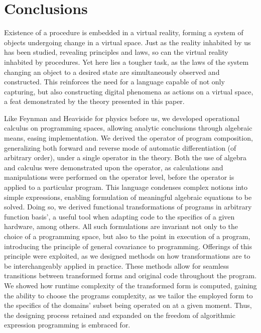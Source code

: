 \documentclass{article}
\begin{document}
\section{Conclusions}

Existence of a procedure is embedded in a virtual reality, forming a system of objects undergoing change in a virtual space. Just as the reality inhabited by us has been studied, revealing principles and laws, so can the virtual reality inhabited by procedures. Yet here lies a tougher task, as the laws of the system changing an object to a desired state are simultaneously observed and constructed. This reinforces the need for a language capable of not only capturing, but also constructing digital phenomena as actions on a virtual space, a feat demonstrated by the theory presented in this paper. 

Like Feynman \cite{Feynman} and Heaviside \cite{Operational} for physics before us, we developed operational calculus on programming spaces, allowing analytic conclusions through algebraic means, easing implementation. We derived the operator of program composition, generalizing both forward and reverse mode of automatic differentiation (of arbitrary order), under a single operator in the theory. Both the use of algebra and calculus were demonstrated upon the operator, as calculations and manipulations were performed on the operator level, before the operator is applied to a particular program.
This language condenses complex notions into simple expressions, enabling formulation of meaningful algebraic equations to be solved. Doing so, we derived functional transformations of programs in arbitrary function basis', a useful tool when adapting code to the specifics of a given hardware, among others.
All such formulations are invariant not only to the choice of a programming space, but also to the point in execution of a program, introducing the principle of general covariance \cite{GeneralCovariance} to programming. Offerings of this principle were exploited, as we designed methods on how transformations are to be interchangeably applied in practice. These methods allow for seamless transitions between transformed forms and original code throughout the program. We showed how runtime complexity of the transformed form is computed, gaining the ability to choose the programs complexity, as we tailor the employed form to the specifics of the domains' subset being operated on at a given moment. Thus, the designing process retained and expanded on the freedom of algorithmic expression programming is embraced for.


  \printbibliography
\end{document}
